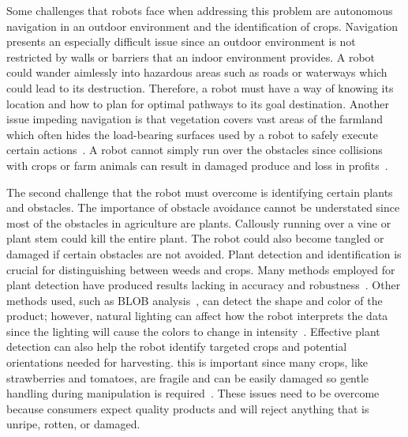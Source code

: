 \documentclass[12pt]{article}
\begin{document}
Some challenges that robots face when addressing this problem are autonomous navigation in an outdoor environment and the identification of crops. Navigation presents an especially difficult issue since an outdoor environment is not restricted by walls or barriers that an indoor environment provides. A robot could wander aimlessly into hazardous areas such as roads or waterways which could lead to its destruction. Therefore, a robot must have a way of knowing its location and how to plan for optimal pathways to its goal destination. Another issue impeding navigation is that vegetation covers vast areas of the farmland which often hides the load-bearing surfaces used by a robot to safely execute certain actions~\cite{1307135}. A robot cannot simply run over the obstacles since collisions with crops or farm animals can result in damaged produce and loss in profits~\cite{madokoro2021prototype}. 

The second challenge that the robot must overcome is identifying certain plants and obstacles. The importance of obstacle avoidance cannot be understated since most of the obstacles in agriculture are plants. Callously running over a vine or plant stem could kill the entire plant. The robot could also become tangled or damaged if certain obstacles are not avoided. Plant detection and identification is crucial for distinguishing between weeds and crops. Many methods employed for plant detection have produced results lacking in accuracy and robustness~\cite{chen2021detecting}.  Other methods used, such as BLOB analysis~\cite{dewi2021blob}, can detect the shape and color of the product; however, natural lighting can affect how the robot interprets the data since the lighting will cause the colors to change in intensity~\cite{wang2022review}. Effective plant detection can also help the robot identify targeted crops and potential orientations needed for harvesting. this is important since many crops, like strawberries and tomatoes, are fragile and can be easily damaged so gentle handling during manipulation is required~\cite{xiong2020autonomous}. These issues need to be overcome because consumers expect quality products and will reject anything that is unripe, rotten, or damaged.

\end{document}
